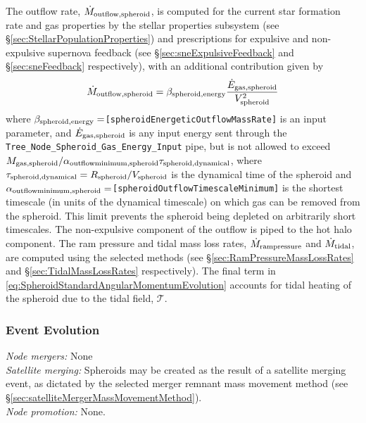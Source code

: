 The outflow rate, $\dot{M}_{\rm outflow, spheroid}$, is computed for the current star formation rate and gas properties by the stellar properties subsystem (see \S\ref{sec:StellarPopulationProperties}) and prescriptions for expulsive and non-expulsive supernova feedback (see \S\ref{sec:sneExpulsiveFeedback} and \S\ref{sec:sneFeedback} respectively), with an additional contribution given by
\begin{equation}
 \dot{M}_{\rm outflow, spheroid} = \beta_{\rm spheroid, energy} {\dot{E}_{\rm gas, spheroid} \over V_{\rm spheroid}^2}
\end{equation}
where $\beta_{\rm spheroid, energy}=${\tt [spheroidEnergeticOutflowMassRate]} is an input parameter, and $\dot{E}_{\rm gas,spheroid}$ is any input energy sent through the {\tt Tree\_Node\_Spheroid\_Gas\_Energy\_Input} pipe, but is not allowed to exceed $M_{\rm gas, spheroid}/ \alpha_{\rm outflow minimum, spheroid} \tau_{\rm spheroid, dynamical}$, where $\tau_{\rm spheroid, dynamical}=R_{\rm spheroid}/V_{\rm spheroid}$ is the dynamical time of the spheroid and $\alpha_{\rm outflow minimum, spheroid}=${\tt [spheroidOutflowTimescaleMinimum]} is the shortest timescale (in units of the dynamical timescale) on which gas can be removed from the spheroid. This limit prevents the spheroid being depleted on arbitrarily short timescales. The non-expulsive \gls{component} of the outflow is piped to the hot halo component. The ram pressure and tidal mass loss rates, $\dot{M}_{\rm ram pressure}$ and $\dot{M}_{\rm tidal}$, are computed using the selected methods (see \S\ref{sec:RamPressureMassLossRates} and \S\ref{sec:TidalMassLossRates} respectively). The final term in \ref{eq:SpheroidStandardAngularMomentumEvolution} accounts for tidal heating of the spheroid due to the tidal field, $\mathcal{T}$.

\subsubsection{Event Evolution}

\noindent\emph{Node mergers:} None\\

\noindent\emph{Satellite merging:} Spheroids may be created as the result of a satellite merging event, as dictated by the selected merger remnant mass movement method (see \S\ref{sec:satelliteMergerMassMovementMethod}).\\

\noindent\emph{Node promotion:} None.\\

